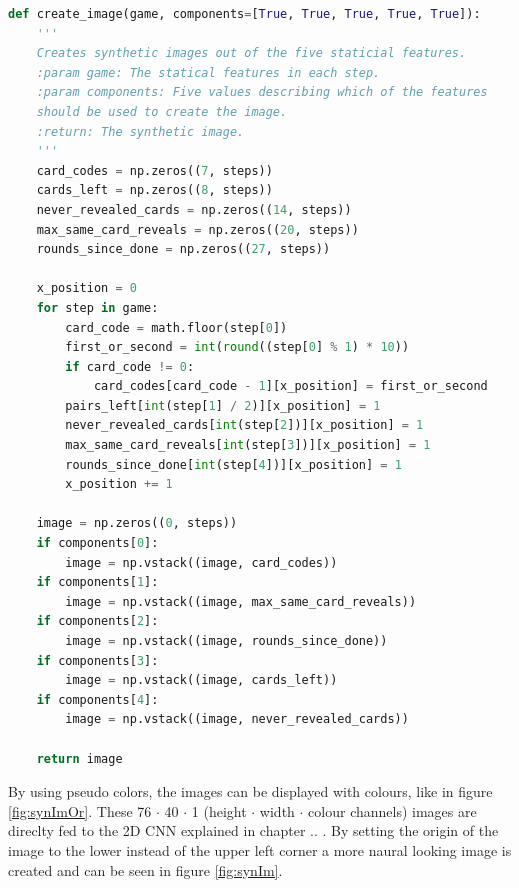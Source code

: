 \begin{lstlisting}[language=python, caption=Add caption, xleftmargin=5.0ex]
def create_image(game, components=[True, True, True, True, True]):
	'''
	Creates synthetic images out of the five staticial features.
	:param game: The statical features in each step. 
	:param components: Five values describing which of the features 
	should be used to create the image. 
	:return: The synthetic image.
	'''
	card_codes = np.zeros((7, steps))
	cards_left = np.zeros((8, steps))
	never_revealed_cards = np.zeros((14, steps))
	max_same_card_reveals = np.zeros((20, steps))
	rounds_since_done = np.zeros((27, steps))
	
	x_position = 0
	for step in game:
		card_code = math.floor(step[0])
		first_or_second = int(round((step[0] % 1) * 10))
		if card_code != 0:
			card_codes[card_code - 1][x_position] = first_or_second 
		pairs_left[int(step[1] / 2)][x_position] = 1
		never_revealed_cards[int(step[2])][x_position] = 1
		max_same_card_reveals[int(step[3])][x_position] = 1
		rounds_since_done[int(step[4])][x_position] = 1
		x_position += 1
	
	image = np.zeros((0, steps))
	if components[0]:   
		image = np.vstack((image, card_codes))
	if components[1]:
		image = np.vstack((image, max_same_card_reveals))
	if components[2]:  
		image = np.vstack((image, rounds_since_done))
	if components[3]:
		image = np.vstack((image, cards_left))
	if components[4]:   
		image = np.vstack((image, never_revealed_cards))
	
	return image
\end{lstlisting}

By using pseudo colors, the images can be displayed with colours, like in figure \ref{fig:synImOr}. These 76 $\cdot$ 40 $\cdot$ 1 (height $\cdot$ width $\cdot$ colour channels) images are direclty fed to the 2D CNN explained in chapter .. . By setting the origin of the image to the lower instead of the upper left corner a more naural looking image is created and can be seen in figure \ref{fig:synIm}. 

